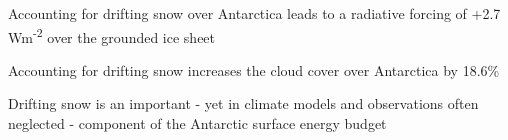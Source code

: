 \documentclass[draft]{agujournal2019}
\begin{document}






\begin{keypoints}
\item Accounting for drifting snow over Antarctica leads to a radiative forcing of +2.7\,Wm\textsuperscript{-2} over the grounded ice sheet
\item Accounting for drifting snow increases the cloud cover over Antarctica by 18.6\%
\item Drifting snow is an important - yet in climate models and observations often neglected - component of the Antarctic surface energy budget
\end{keypoints}

%
%

%
%
\end{document}
